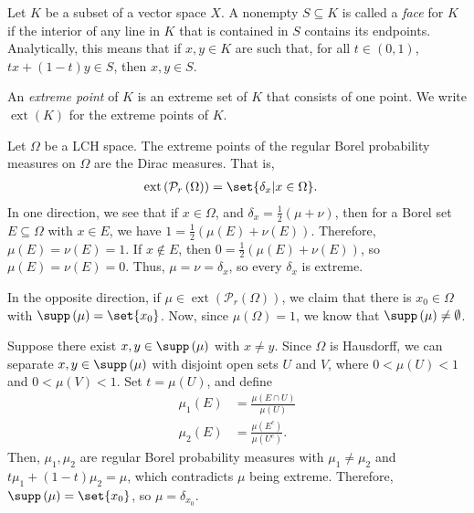 \documentclass[10pt]{mypackage}
\begin{document}
\begin{definition}
  Let $K$ be a subset of a vector space $X$. A nonempty $S\subseteq K$ is called a \textit{face} for $K$ if the interior of any line in $K$ that is contained in $S$ contains its endpoints. Analytically, this means that if $x,y\in K$ are such that, for all $t\in (0,1)$, $tx + \left( 1-t \right)y\in S$, then $x,y\in S$.\newline

  An \textit{extreme point} of $K$ is an extreme set of $K$ that consists of one point. We write $\operatorname{ext}\left( K \right)$ for the extreme points of $K$.
\end{definition}
\begin{example}
  Let $\Omega$ be a LCH space. The extreme points of the regular Borel probability measures on $\Omega$ are the Dirac measures. That is,
  \begin{align*}
    \operatorname{ext}\left( \mathcal{P}_{r}\left( \Omega \right) \right) &= \set{\delta_x | x\in\Omega}.
  \end{align*}
  In one direction, we see that if $x\in \Omega$, and $\delta_x = \frac{1}{2}\left( \mu + \nu \right)$, then for a Borel set $E\subseteq \Omega$ with $x\in E$, we have $1 = \frac{1}{2}\left( \mu\left( E \right) + \nu\left( E \right) \right)$. Therefore, $\mu(E)=\nu(E) = 1$. If $x\notin E$, then $0 = \frac{1}{2}\left( \mu\left( E \right) + \nu\left( E \right) \right)$, so $\mu(E) = \nu(E) = 0$. Thus, $\mu=\nu=\delta_x$, so every $\delta_x$ is extreme.\newline

  In the opposite direction, if $\mu\in \operatorname{ext}\left( \mathcal{P}_r\left( \Omega \right) \right)$, we claim that there is $x_0\in \Omega$ with $\supp\left( \mu \right) = \set{x_0}$. Now, since $\mu\left( \Omega \right) = 1$, we know that $\supp\left( \mu \right) \neq\emptyset$.\newline

  Suppose there exist $x,y\in \supp\left( \mu \right)$ with $x\neq y$. Since $\Omega$ is Hausdorff, we can separate $x,y\in \supp\left( \mu \right)$ with disjoint open sets $U$ and $V$, where $0 < \mu\left( U \right) < 1$ and $0 < \mu\left( V \right) < 1$. Set $t = \mu\left( U \right)$, and define
  \begin{align*}
    \mu_1\left( E \right) &= \frac{\mu\left( E\cap U \right)}{\mu\left( U \right)}\\
    \mu_2\left( E \right) &= \frac{\mu\left( E^{c} \right)}{\mu\left( U^{c} \right)}.
  \end{align*}
  Then, $\mu_1,\mu_2$ are regular Borel probability measures with $\mu_1\neq \mu_2$ and $t\mu_1 + \left( 1-t \right)\mu_2 = \mu$, which contradicts $\mu$ being extreme. Therefore, $\supp\left( \mu \right) = \set{x_0}$, so $\mu = \delta_{x_0}$.
\end{example}
\end{document}
